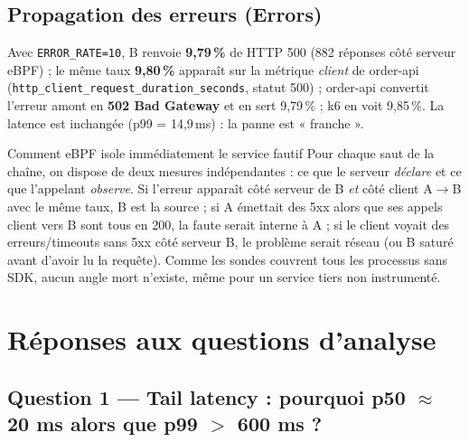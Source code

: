 \documentclass[10pt,a4paper]{article}
\newcommand{\code}[1]{\texttt{\small #1}}
\begin{document}
\subsection{Propagation des erreurs (Errors)}

Avec \code{ERROR\_RATE=10}, B renvoie \textbf{9,79\,\%} de HTTP 500 (882 réponses côté serveur eBPF) ; le même taux \textbf{9,80\,\%} apparaît sur la métrique \emph{client} de order-api (\code{http\_client\_request\_duration\_seconds}, statut 500) ; order-api convertit l'erreur amont en \textbf{502 Bad Gateway} et en sert 9,79\,\% ; k6 en voit 9,85\,\%. La latence est inchangée (p99 = 14,9\,ms) : la panne est « franche ».

\begin{reponse}{Comment eBPF isole immédiatement le service fautif}
Pour chaque saut de la chaîne, on dispose de deux mesures indépendantes : ce que le serveur \emph{déclare} et ce que l'appelant \emph{observe}. Si l'erreur apparaît côté serveur de B \emph{et} côté client A$\rightarrow$B avec le même taux, B est la source ; si A émettait des 5xx alors que ses appels client vers B sont tous en 200, la faute serait interne à A ; si le client voyait des erreurs/timeouts sans 5xx côté serveur B, le problème serait réseau (ou B saturé avant d'avoir lu la requête). Comme les sondes couvrent tous les processus sans SDK, aucun angle mort n'existe, même pour un service tiers non instrumenté.
\end{reponse}

\section{Réponses aux questions d'analyse}

\subsection*{Question 1 — Tail latency : pourquoi p50 $\approx$ 20 ms alors que p99 $>$ 600 ms ?}
\end{document}
